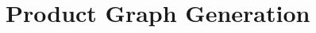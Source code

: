 \documentclass[numbers, 10pt, preprint]{sigplanconf}
\newcommand{\sysname}{{\small \sf Methane}\xspace}
\begin{document}
%
%
%


%
%
%
%

\section{Product Graph Generation}
\label{sec:language}



\end{document}
